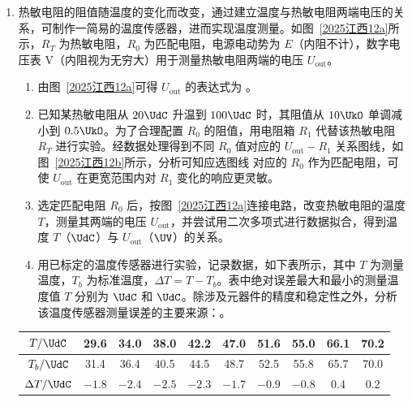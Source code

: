 \documentclass[\gkver]{gaokaozhenti}
\begin{document}
\begin{enumerate}
{根据几何关系可得滑块通过两光电门下降的高度 $H_{L} = L\sin\theta = 65 \times 0.0613 \Ucm = 3.98 \Ucm$

（3）守恒；根据图（b）可知其斜率约为 $k = \frac{0.392}{0.020} \Umsq = 19.6 \Umsq = 2g$。

故在误差范围内 $\Delta v^{2} = 2gH_{L}$ 成立，说明下滑过程中滑块的动能增加量等于重力势能的减少量，即机械能守恒。
}

\item
热敏电阻的阻值随温度的变化而改变，通过建立温度与热敏电阻两端电压的关系，可制作一简易的温度传感器，进而实现温度测量。如图~\ref{2025江西12a}所示，$R_{T}$ 为热敏电阻，$R_{0}$ 为匹配电阻，电源电动势为 $E$（内阻不计），数字电压表 V（内阻视为无穷大）用于测量热敏电阻两端的电压 $U_{\text{out}}$。

\begin{enumerate}
\item
由图~\ref{2025江西12a}可得 $U_{\text{out}}$ 的表达式为 。
\item
已知某热敏电阻从 $20 \UdC$ 升温到 $100 \UdC$ 时，其阻值从 $10 \UkO$ 单调减小到 $0.5 \UkO$。为了合理配置 $R_{0}$ 的阻值，用电阻箱 $R_{1}$ 代替该热敏电阻 $R_{T}$ 进行实验。经数据处理得到不同 $R_{0}$ 值对应的 $U_{\text{out}}-R_{1}$ 关系图线，如图~\ref{2025江西12b}所示，分析可知应选图线  对应的 $R_{0}$ 作为匹配电阻，可使 $U_{\text{out}}$ 在更宽范围内对 $R_{1}$ 变化的响应更灵敏。
\item
选定匹配电阻 $R_{0}$ 后，按图~\ref{2025江西12a}连接电路，改变热敏电阻的温度 $T$，测量其两端的电压 $U_{\text{out}}$，并尝试用二次多项式进行数据拟合，得到温度 $T$（$\UdC$）与 $U_{\text{out}}$（$\UV$）的关系。
\item
用已标定的温度传感器进行实验，记录数据，如下表所示，其中 $T$ 为测量温度，$T_{b}$ 为标准温度，$\Delta T = T - T_{b}$。表中绝对误差最大和最小的测量温度值 $T$ 分别为  $\UdC$ 和  $\UdC$。除涉及元器件的精度和稳定性之外，分析该温度传感器测量误差的主要来源：。
\end{enumerate}

\begin{center}
\begin{tabular}{|c|c|c|c|c|c|c|c|c|c|}
\hline
$T/\UdC$ & 29.6 & 34.0 & 38.0 & 42.2 & 47.0 & 51.6 & 55.0 & 66.1 & 70.2 \\
\hline
$T_{b}/\UdC$ & 31.4 & 36.4 & 40.5 & 44.5 & 48.7 & 52.5 & 55.8 & 65.7 & 70.0 \\
\hline
$\Delta T/\UdC$ & $-1.8$ & $-2.4$ & $-2.5$ & $-2.3$ & $-1.7$ & $-0.9$ & $-0.8$ & 0.4 & 0.2 \\
\hline
\end{tabular}
\end{center}


\end{enumerate}
\end{document}
